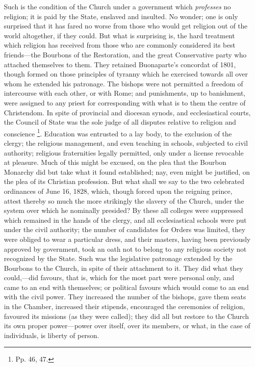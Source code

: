 Such is the condition of the Church under a
government which \emph{professes} no religion; it is paid by the
State, enslaved and insulted. No wonder; one is only surprised that it
has fared no worse from those who would get religion out of the world
altogether, if they could. But what is surprising is, the hard
treatment which religion has received from those who are commonly
considered its best friends—the Bourbons of the Restoration, and the
great Conservative party who attached themselves to them. They
retained Buonaparte's concordat of 1801, though formed on those
principles of tyranny which he exercised towards all over whom he
extended his patronage. The bishops were not permitted a freedom of
intercourse with each other, or with Rome; and punishments, up to
banishment, were assigned to any priest for corresponding with what is
to them the centre of Christendom. In spite of provincial and diocesan
synods, and ecclesiastical courts, the Council of State was the sole
judge of all disputes relative to religion and conscience \footnote{Pp. 46, 47.}. Education was entrusted to a lay body, to the exclusion of the
clergy; the religious management, and even teaching in schools,
subjected to civil authority; religious fraternities legally
permitted, only under a license revocable at pleasure. Much of this
might be excused, on the plea that the Bourbon Monarchy did but take
what it found established; nay, even might be justified, on the plea
of its Christian profession. But what shall we say to the two
celebrated ordinances of June 16, 1828, which, though forced upon the
reigning prince, attest thereby so much the more strikingly the
slavery of the Church, under the system over which he nominally
presided? By these all colleges were suppressed which remained in the
hands of the clergy, and all ecclesiastical schools were put under the
civil authority; the number of candidates for Orders was limited, they
were obliged to wear a particular dress, and their masters, having
been previously approved by government, took an oath not to belong to
any religious society not recognized by the State. Such was the
legislative patronage extended by the Bourbons to the Church, in spite
of their attachment to it. They did what they could,—did favours,
that is, which for the most part were personal only, and came to an
end with themselves; or political favours which would come to an end
with the civil power. They increased the number of the bishops, gave
them seats in the Chamber, increased their stipends, encouraged the
ceremonies of religion, favoured its missions (as they were called); they did all but restore to the Church its own proper
power—power over itself, over its members, or what, in the case of
individuals, is liberty of person.

